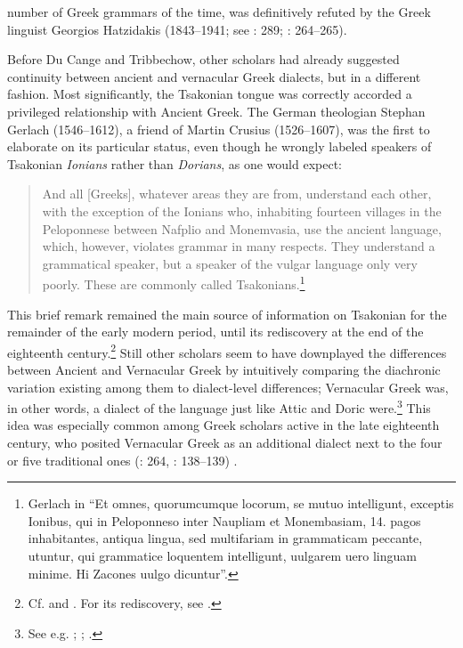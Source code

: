 number of Greek grammars of the time, was definitively refuted by the Greek linguist Georgios Hatzidakis (1843–1941; see \citealt{Argyropoulos2009}: 289; \citealt{Mackridge2009}: 264–265).

Before Du Cange and Tribbechow, other scholars had already suggested continuity between ancient and vernacular Greek dialects, but in a different fashion. Most significantly, the Tsakonian tongue was correctly accorded a privileged relationship with Ancient Greek. The German theologian Stephan Gerlach (1546–1612), a friend of Martin Crusius (1526–1607), was the first to elaborate on its particular status, even though he wrongly labeled speakers of Tsakonian \textit{Ionians} rather than \textit{Dorians}, as one would expect:

\begin{quote}
And all [Greeks], whatever areas they are from, understand each other, with the exception of the Ionians who, inhabiting fourteen villages in the Peloponnese between Nafplio and Monemvasia, use the ancient language, which, however, violates grammar in many respects. They understand a grammatical speaker, but a speaker of the vulgar language only very poorly. These are commonly called Tsakonians.\footnote{Gerlach in \citet[489]{Crusius1584} “Et omnes, quorumcumque locorum, se mutuo intelligunt, exceptis Ionibus, qui in Peloponneso inter Naupliam et Monembasiam, 14. pagos inhabitantes, antiqua lingua, sed multifariam in grammaticam peccante, utuntur, qui grammatice loquentem intelligunt, uulgarem uero linguam minime. Hi Zacones uulgo dicuntur”.}
\end{quote}

This brief remark remained the main source of information on Tsakonian for the remainder of the early modern period, until its rediscovery at the end of the eighteenth century.\footnote{Cf. \citet[44]{Howell1650a} and \citet[vii]{Du1688}. For its rediscovery, see \citet{Famerie2007}.} Still other scholars seem to have downplayed the differences between Ancient and Vernacular Greek by intuitively comparing the diachronic variation existing among them to dialect-level differences; Vernacular Greek was, in other words, a dialect of the language just like Attic and Doric were.\footnote{See e.g. \citet[47--48]{Castillo1678}; \citet[\textsc{i.}184, 4th sequence of pagination]{Chambers1728}; \citet[]{Freret1809}.} This idea was especially common among Greek scholars active in the late eighteenth century, who posited Vernacular Greek as an additional dialect next to the four or five traditional ones (\citealt{Mackridge2009}: 264, \citealt{Mackridge2014}: 138--139) .

